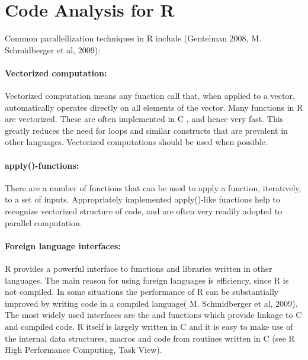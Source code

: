 \documentclass[12pt]{article}
\begin{document}
\section{Code Analysis for R}
Common parallellization techniques in R include (Gentelman 2008, M. Schmidberger et al, 2009):

\paragraph{Vectorized computation:}
 Vectorized computation means any function call that, when applied to a vector, automatically operates directly on all elements of the vector. Many functions in R are vectorized. These are often implemented in C , and hence very fast. This greatly reduces the need for loops and similar constructs that are prevalent in other languages. Vectorized computations should be used when possible.\\
%

\paragraph{apply()-functions:}
 There are a number of functions that can be used to apply a function, iteratively, to a set of inputs. Appropriately implemented apply()-like functions help to recognize vectorized structure of code, and are often very readily adopted to parallel computation.\\
%

\paragraph{Foreign language interfaces: }
R provides a powerful interface to functions and libraries written in other languages. The main reason for using foreign languages is efficiency, since R is not compiled. In some situations the performance of R can be substantially improved by writing code in a compiled language( M. Schmidberger et al, 2009).\\
 The most widely used interfaces are the  and  functions which provide linkage to C and compiled code. R itself is largely written in C and it is easy to make use of the internal data structures, macros and code from routines written in C (see R High Performance Computing, Task View).\\
%
\end{document}
